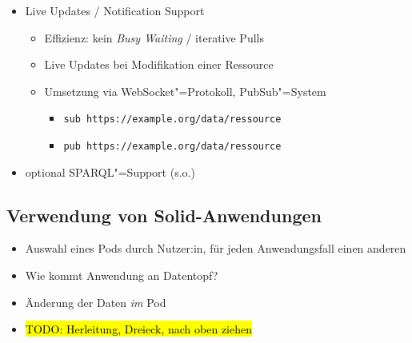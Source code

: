 \begin{itemize}
    \item Live Updates / Notification Support
    \begin{itemize}
        \item Effizienz: kein \emph{Busy Waiting} / iterative Pulls
        \item Live Updates bei Modifikation einer Ressource~\cite{sambraSolidPlatformDecentralized2016}
        \item Umsetzung via WebSocket"=Protokoll, PubSub"=System~\cite{sambraSolidPlatformDecentralized2016}
        \begin{itemize}
            \item \verb|sub https://example.org/data/ressource|
            \item \verb|pub https://example.org/data/ressource|
        \end{itemize}
    \end{itemize}

    \item optional SPARQL"=Support (s.o.)~\cite{sambraSolidPlatformDecentralized2016}
\end{itemize}


\subsection{Verwendung von Solid-Anwendungen}

\begin{itemize}
    \item Auswahl eines Pods durch Nutzer:in, für jeden Anwendungsfall einen anderen
    \item Wie kommt Anwendung an Datentopf?
    \item Änderung der Daten \emph{im} Pod
    \item \hl{TODO: Herleitung, Dreieck, nach oben ziehen}
\end{itemize}

\vspace{1cm}

